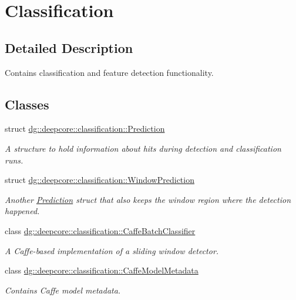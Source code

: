 \hypertarget{group___classification_module}{}\section{Classification}
\label{group___classification_module}


\subsection{Detailed Description}
Contains classification and feature detection functionality. 

\subsection*{Classes}
\begin{DoxyCompactItemize}
\item 
struct \hyperlink{structdg_1_1deepcore_1_1classification_1_1_prediction}{dg\+::deepcore\+::classification\+::\+Prediction}
\begin{DoxyCompactList}\small\item\em A structure to hold information about hits during detection and classification runs. \end{DoxyCompactList}\item 
struct \hyperlink{structdg_1_1deepcore_1_1classification_1_1_window_prediction}{dg\+::deepcore\+::classification\+::\+Window\+Prediction}
\begin{DoxyCompactList}\small\item\em Another \hyperlink{structdg_1_1deepcore_1_1classification_1_1_prediction}{Prediction} struct that also keeps the window region where the detection happened. \end{DoxyCompactList}\item 
class \hyperlink{classdg_1_1deepcore_1_1classification_1_1_caffe_batch_classifier}{dg\+::deepcore\+::classification\+::\+Caffe\+Batch\+Classifier}
\begin{DoxyCompactList}\small\item\em A Caffe-\/based implementation of a sliding window detector. \end{DoxyCompactList}\item 
class \hyperlink{structdg_1_1deepcore_1_1classification_1_1_caffe_model_metadata}{dg\+::deepcore\+::classification\+::\+Caffe\+Model\+Metadata}
\begin{DoxyCompactList}\small\item\em Contains Caffe model metadata. \end{DoxyCompactList}\item 

\end{DoxyCompactItemize}
